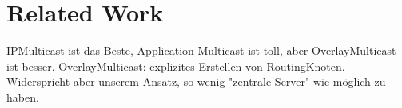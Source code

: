 \chapter{Related Work}
\label{chap:related}

IPMulticast ist das Beste, Application Multicast ist toll, aber OverlayMulticast ist besser. OverlayMulticast: explizites Erstellen von RoutingKnoten. Widerspricht aber unserem Ansatz, so wenig "zentrale Server" wie möglich zu haben.\cite{Lao2005Comparative}















